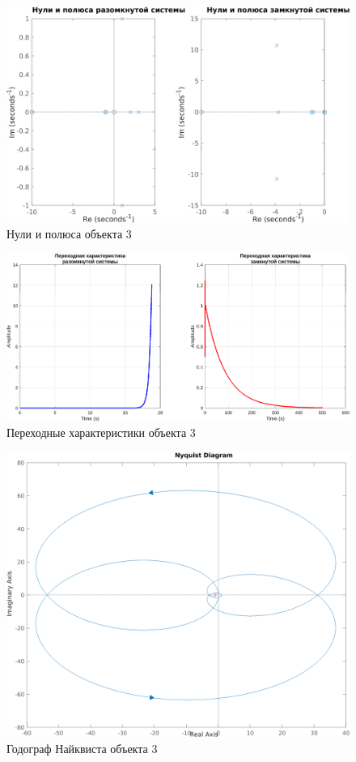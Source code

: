 \begin{figure}[H]
    \centering
    \includegraphics[width=\textwidth]{figs/task_1_obj_3_zeros_poles.png}
    \caption{Нули и полюса объекта 3}
    \label{fig:obj3_pz}
\end{figure}

\begin{figure}[H]
    \centering
    \includegraphics[width=\textwidth]{figs/task_1_obj_3_step.png}
    \caption{Переходные характеристики объекта 3}
    \label{fig:obj3_step}
\end{figure}

\begin{figure}[H]
    \centering
    \includegraphics[width=\textwidth]{figs/task_1_obj_3_nyquist.png}
    \caption{Годограф Найквиста объекта 3}
    \label{fig:obj3_nyquist}
\end{figure}

